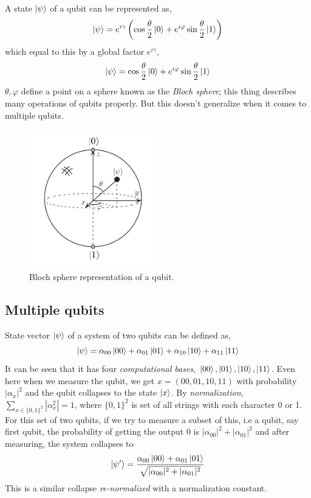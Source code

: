 A state $\ket{\psi}$ of a qubit can be represented as,
\begin{equation}
    \ket{\psi} = e^{i\gamma}\left( \cos{\frac{\theta}{2}}\ket{0} + e^{i\varphi}\sin{\frac{\theta}{2}}\ket{1}  \right)
\end{equation}
which equal to this by a global factor $e^{i\gamma}$,
\begin{equation}
    \ket{\psi} = \cos{\frac{\theta}{2}}\ket{0} + e^{i\varphi}\sin{\frac{\theta}{2}}\ket{1}
\end{equation}
$\theta, \varphi$ define a point on a sphere known as the \textit{Bloch sphere}; this thing describes many operations of qubits properly. But this doesn't generalize when it comes to multiple qubits.
\begin{figure}[H]
    \centering
    \includegraphics[width=0.5\textwidth]{images/bloch_sphere.png}
    \caption{Bloch sphere representation of a qubit.}
    \label{fig:bloch_sphere}
\end{figure}

\subsection{Multiple qubits}
State vector $\ket{\psi}$ of a system of two qubits can be defined as,
\begin{equation}
    \ket{\psi} = \alpha_{00} \ket{00}
         +\alpha_{01} \ket{01}
         +\alpha_{10} \ket{10}
         +\alpha_{11} \ket{11}
\end{equation}
It can be seen that it has four \textit{computational bases}, $\ket{00}, \ket{01}, \ket{10}, \ket{11}$. Even here when we measure the qubit, we get $x=(00, 01, 10, 11)$ with probability $|\alpha_x|^2$ and the qubit collapses to the state $\ket{x}$. By \textit{normalization}, $\sum_{x\in \{0,1\}^2} |\alpha_x^2| = 1$, where $\{ 0, 1\}^2$ is set of all strings with each character 0 or 1. For this set of two qubits, if we try to measure a subset of this, i.e a qubit, say first qubit, the probability of getting the output 0 is $|\alpha_{00}|^2+|\alpha_{01}|^2$ and after measuring, the system collapses to
\begin{equation}
    \ket{\psi'} =
    \frac{\alpha_{00} \ket{00}
         +\alpha_{01} \ket{01}}{\sqrt{|\alpha_{00}|^2+|\alpha_{01}|^2}}
\end{equation}
This is a similar collapse \textit{re-normalized} with a normalization constant.

